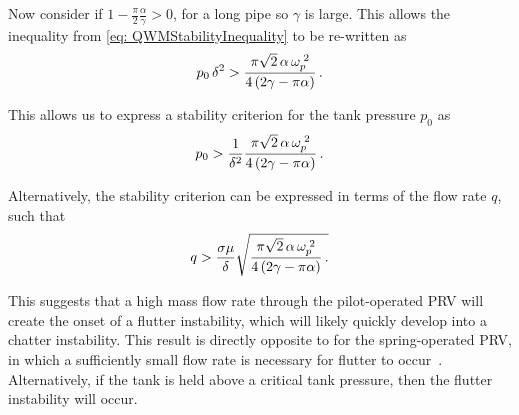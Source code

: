 Now consider if $1 - \frac{\pi}{2} \frac{\alpha}{\gamma} > 0$, for a long pipe so $\gamma$ is large. This allows the inequality from \cref{eq: QWMStabilityInequality} to be re-written as
~
\begin{equation*}
    p_0 \, \delta^2 > \frac{\pi \sqrt{2} \, \alpha \, \omega_p^{\;2}}{4 \left( 2 \gamma - \pi \alpha \right)} \, .
\end{equation*}

This allows us to express a stability criterion for the tank pressure $p_0$ as
~
\begin{equation*}
    p_0 > \frac{1}{\delta^2} \frac{\pi \sqrt{2} \, \alpha \, \omega_p^{\;2}}{4 \left( 2 \gamma - \pi \alpha \right) } \, .
\end{equation*}

Alternatively, the stability criterion can be expressed in terms of the flow rate $q$, such that
~
\begin{equation*}
    q > \frac{\sigma \mu}{\delta} \sqrt{
    \frac{\pi \sqrt{2} \, \alpha \, \omega_p^{\;2}}{4 \left( 2 \gamma - \pi \alpha \right) } \, .
    }
\end{equation*}

This suggests that a high mass flow rate through the pilot-operated PRV will create the onset of a flutter instability, which will likely quickly develop into a chatter instability. This result is directly opposite to for the spring-operated PRV, in which a sufficiently small flow rate is necessary for flutter to occur~\cite{Hos2015ModelPipe,Hos2016DynamicService}. Alternatively, if the tank is held above a critical tank pressure, then the flutter instability will occur.

